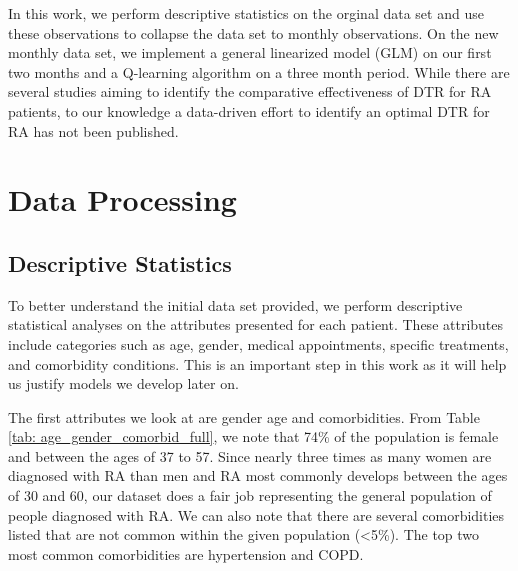 \documentclass[10pt]{article}
\begin{document}
In this work, we perform descriptive statistics on the orginal data set and use these observations to collapse the data set to monthly observations. On the new monthly data set, we implement a general linearized model (GLM) on our first two months and a Q-learning algorithm on a three month period. While there are several studies aiming to identify the comparative effectiveness of DTR for RA patients, to our knowledge a data-driven effort to identify an optimal DTR for RA has not been published.  

\section{Data Processing}

\subsection{Descriptive Statistics}
To better understand the initial data set provided, we perform descriptive statistical analyses on the attributes presented for each patient. These attributes include categories such as age, gender, medical appointments, specific treatments, and comorbidity conditions. This is an important step in this work as it will help us justify models we develop later on. 

The first attributes we look at are gender age and comorbidities. From Table \ref{tab: age_gender_comorbid_full}, we note that 74\% of the population is female and between the ages of 37 to 57. Since nearly three times as many women are diagnosed with RA than men and RA most commonly develops between the ages of 30 and 60, our dataset does a fair job representing the general population of people diagnosed with RA. We can also note that there are several comorbidities listed that are not common within the given population (<5\%).  The top two most common comorbidities are hypertension and COPD. 
\end{document}
